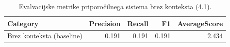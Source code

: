 \begin{table}[h]
\centering
\caption{Evalvacijske metrike priporočilnega sistema brez konteksta (4.1).}
\label{tab:evaluation_metrics_4_1}
\begin{tabular}{lrrrr}
\toprule
Category & Precision & Recall & F1 & AverageScore \\
\midrule
Brez konteksta (baseline) & 0.191 & 0.191 & 0.191 & 2.434 \\
\bottomrule
\end{tabular}

\end{table}
